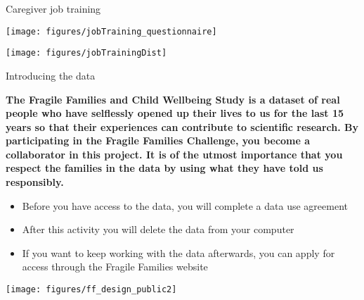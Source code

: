 \documentclass{beamer}
\begin{document}
\begin{frame}{Caregiver job training}

\centering
\texttt{[image: figures/jobTraining\_questionnaire]}

\end{frame}
\begin{frame}

\centering
\texttt{[image: figures/jobTrainingDist]}

\end{frame}
\begin{frame}

\Large{
\begin{center}
Introducing the data
\end{center}
}

\end{frame}
\begin{frame}

\textbf{The Fragile Families and Child Wellbeing Study is a dataset of real people who have selflessly opened up their lives to us for the last 15 years so that their experiences can contribute to scientific research. By participating in the Fragile Families Challenge, you become a collaborator in this project. It is of the utmost importance that you respect the families in the data by using what they have told us responsibly.}

\end{frame}
\begin{frame}

\begin{itemize}
\item Before you have access to the data, you will complete a data use agreement
\pause
\item After this activity you will delete the data from your computer
\pause
\item If you want to keep working with the data afterwards, you can apply for access through the Fragile Families website
\end{itemize}

\end{frame}
\begin{frame}

\begin{center}
\texttt{[image: figures/ff\_design\_public2]}
\end{center}

\end{frame}
\end{document}
